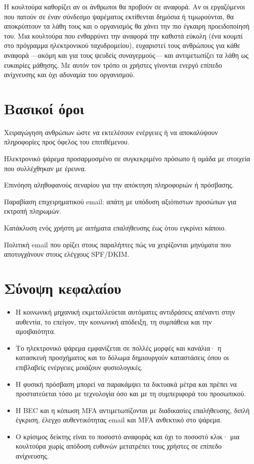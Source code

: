 \documentclass[11pt,openany]{book}
\begin{document}
Η κουλτούρα καθορίζει αν οι άνθρωποι θα προβούν σε αναφορά. Αν οι εργαζόμενοι που πατούν σε έναν σύνδεσμο ψαρέματος εκτίθενται δημόσια ή τιμωρούνται, θα αποκρύπτουν τα λάθη τους και ο οργανισμός θα χάνει την πιο έγκαιρη προειδοποίησή του. Μια κουλτούρα που ενθαρρύνει την αναφορά την καθιστά εύκολη (ένα κουμπί στο πρόγραμμα ηλεκτρονικού ταχυδρομείου), ευχαριστεί τους ανθρώπους για κάθε αναφορά —ακόμη και για τους ψευδείς συναγερμούς— και αντιμετωπίζει τα λάθη ως ευκαιρίες μάθησης. Με αυτόν τον τρόπο οι χρήστες γίνονται ενεργό επίπεδο ανίχνευσης και όχι αδυναμία του οργανισμού.

\section*{Βασικοί όροι}
\begin{description}[style=nextline,leftmargin=1.2em]
  \item[Κοινωνική μηχανική] Χειραγώγηση ανθρώπων ώστε να εκτελέσουν ενέργειες ή να αποκαλύψουν πληροφορίες προς όφελος του επιτιθέμενου.
  \item[Στοχευμένο ψάρεμα] Ηλεκτρονικό ψάρεμα προσαρμοσμένο σε συγκεκριμένο πρόσωπο ή ομάδα με στοιχεία που συλλέχθηκαν με έρευνα.
  \item[Κατασκευή προσχήματος] Επινόηση αληθοφανούς σεναρίου για την απόκτηση πληροφοριών ή πρόσβασης.
  \item[BEC] Παραβίαση επιχειρηματικού email: απάτη με υπόδυση αξιόπιστων προσώπων για εκτροπή πληρωμών.
  \item[Κόπωση MFA] Κατάκλυση ενός χρήστη με αιτήματα επαλήθευσης έως ότου εγκρίνει κάποιο.
  \item[DMARC] Πολιτική email που ορίζει στους παραλήπτες πώς να χειρίζονται μηνύματα που αποτυγχάνουν στους ελέγχους SPF/DKIM.
\end{description}

\section*{Σύνοψη κεφαλαίου}
\begin{itemize}
  \item Η κοινωνική μηχανική εκμεταλλεύεται αυτόματες αντιδράσεις απέναντι στην αυθεντία, το επείγον, την κοινωνική απόδειξη, τη συμπάθεια και την αμοιβαιότητα.
  \item Το ηλεκτρονικό ψάρεμα εμφανίζεται σε πολλές μορφές και κανάλια· η κατασκευή προσχήματος και το δόλωμα δημιουργούν καταστάσεις όπου οι επιβλαβείς ενέργειες μοιάζουν φυσιολογικές.
  \item Η φυσική πρόσβαση μπορεί να παρακάμψει τα δικτυακά μέτρα και πρέπει να προστατεύεται τόσο με τεχνολογία όσο και με τη συμπεριφορά του προσωπικού.
  \item Η BEC και η κόπωση MFA αντιμετωπίζονται με διαδικασίες επαλήθευσης, διπλή έγκριση, έλεγχο αυθεντικότητας email και MFA ανθεκτικό στο ψάρεμα.
  \item Ο κρίσιμος δείκτης είναι το ποσοστό αναφοράς και όχι το ποσοστό κλικ· μια κουλτούρα χωρίς απόδοση ευθυνών μετατρέπει τους χρήστες σε επίπεδο ανίχνευσης.
\end{itemize}
\end{document}
